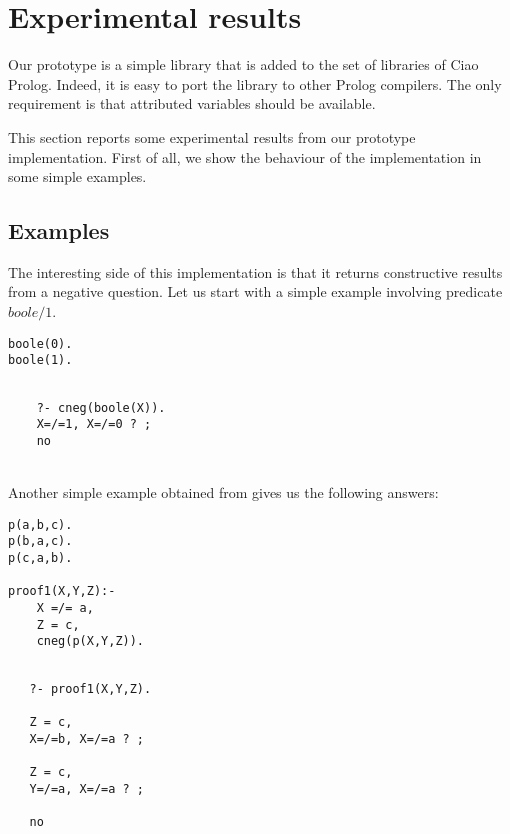 \documentclass{llncs}
\begin{document}
\section{Experimental results}
\label{results}

Our prototype is a simple library that is added to the set of
libraries of Ciao Prolog. Indeed, it is easy to port the library to
other Prolog compilers. The only requirement is that attributed
variables should be available.

This section reports some experimental results from our prototype
implementation.  First of all, we show the behaviour of the
implementation in some simple examples.


\subsection{Examples}
\label{examples}

The interesting side of this implementation is that it returns
constructive results from a negative question. Let us start with a
simple example involving predicate $boole/1$.

\begin{minipage}{2in}
\begin{verbatim}
boole(0).
boole(1).
\end{verbatim}
\end{minipage}
\begin{minipage}{2in}
\begin{verbatim} 

    ?- cneg(boole(X)).
    X=/=1, X=/=0 ? ;
    no
\end{verbatim} 
\end{minipage}\\

Another simple example obtained from \cite{Stuckey95} gives us the
following answers:

\begin{minipage}{2in}
\begin{verbatim}
p(a,b,c).
p(b,a,c).
p(c,a,b).

proof1(X,Y,Z):-
    X =/= a,
    Z = c,
    cneg(p(X,Y,Z)).
\end{verbatim}
\end{minipage}
\begin{minipage}{2in}
\begin{verbatim} 

   ?- proof1(X,Y,Z).

   Z = c,
   X=/=b, X=/=a ? ;

   Z = c,
   Y=/=a, X=/=a ? ;

   no
\end{verbatim} 
\end{minipage}\\
\end{document}
